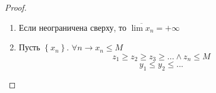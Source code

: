 \documentclass[12pt]{article}
\newenvironment{MyList}[1][4pt]{
  \begin{enumerate}[1.]
  \setlength{\parskip}{0pt}
  \setlength{\itemsep}{#1}
}{       
  \end{enumerate}
}
\theoremstyle{definition} %
\theoremstyle{plain} %
\theoremstyle{remark} %
\begin{document}
\begin{proof}
    \begin{MyList}
        \item Если неограничена сверху, то $\overline{\lim x_n} = +\infty$
        \item Пусть $\left\{x_n\right\}$. $\forall n \to x_n \leqslant M$
        \[z_1 \geqslant z_2 \geqslant z_3 \geqslant ... \wedge z_n \leqslant M\]
        \[y_1 \leqslant y_2 \leqslant ...\]   
    \end{MyList}
\end{proof}
\end{document}
